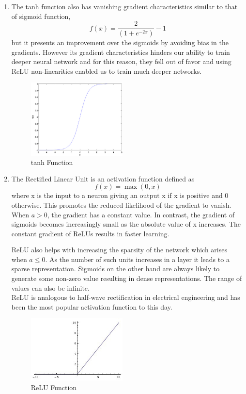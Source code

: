 \begin{enumerate}[label=(\alph*)]
\item The tanh function also has vanishing gradient characteristics similar to that of sigmoid function,
\begin{equation}
    f(x) = \frac{2}{(1+e^{-2x})}-1
\end{equation}
but it presents an improvement over the sigmoids by avoiding bias in the gradients. However its gradient characteristics hinders our ability to train deeper neural network and for this reason, they fell out of favor and using ReLU non-linearities enabled us to train much deeper networks. 

\begin{figure}[ht]
\centering
\includegraphics[width=50mm]{lectures/02-b/tanh_function.png}
\caption{tanh Function}
\label{fig:tanh}
\end{figure}

\item The Rectified Linear Unit is an activation function defined as 
\begin{equation}
    f(x) = \max (0,x)
\end{equation}
where x is the input to a neuron giving an output x if x is positive and 0 otherwise. This promotes the reduced likelihood of the gradient to vanish. When $a > 0$, the gradient has a constant value. In contrast, the gradient of sigmoids becomes increasingly small as the absolute value of x increases. The constant gradient of ReLUs results in faster learning. 

ReLU also helps with increasing the sparsity of the network which arises when $a ≤ 0$. As the number of such units increases in a layer it leads to a sparse representation. Sigmoids on the other hand are always likely to generate some non-zero value resulting in dense representations. The range of values can also be infinite.\\

ReLU is analogous to half-wave rectification in electrical engineering and has been the most popular activation function to this day.

\begin{figure}[ht]
\centering
\includegraphics[width=50mm]{lectures/02-b/ReLU_function.jpg}
\caption{ReLU Function}
\label{fig:relu}
\end{figure}
\end{enumerate}

